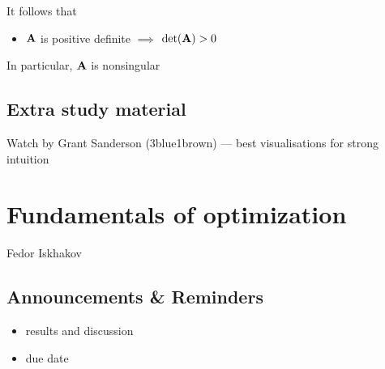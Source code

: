 \documentclass[letterpaper,10pt,english]{jupyterBook}
\begin{document}
\sphinxAtStartPar
It follows that
\begin{itemize}
\item {} 
\sphinxAtStartPar
\({\bf A}\) is positive definite \(\implies\) \(\det({\bf A}) > 0\)

\end{itemize}

\sphinxAtStartPar
In particular, \({\bf A}\) is nonsingular


\section{Extra study material}
\label{\detokenize{05.linear_algebra:extra-study-material}}\label{\detokenize{05.linear_algebra:id1}}
\sphinxAtStartPar
Watch  by Grant Sanderson (3blue1brown) — best visualisations for strong intuition

\sphinxstepscope


\chapter{Fundamentals of optimization}
\label{\detokenize{06.optimization_fundamentals:fundamentals-of-optimization}}\label{\detokenize{06.optimization_fundamentals::doc}}
\sphinxAtStartPar
{}
Fedor Iskhakov


\section{Announcements \& Reminders}
\label{\detokenize{06.optimization_fundamentals:announcements-reminders}}\begin{itemize}
\item {} 
\sphinxAtStartPar
{} results and discussion

\item {} 
\sphinxAtStartPar
{} due date 

\end{itemize}
\end{document}

